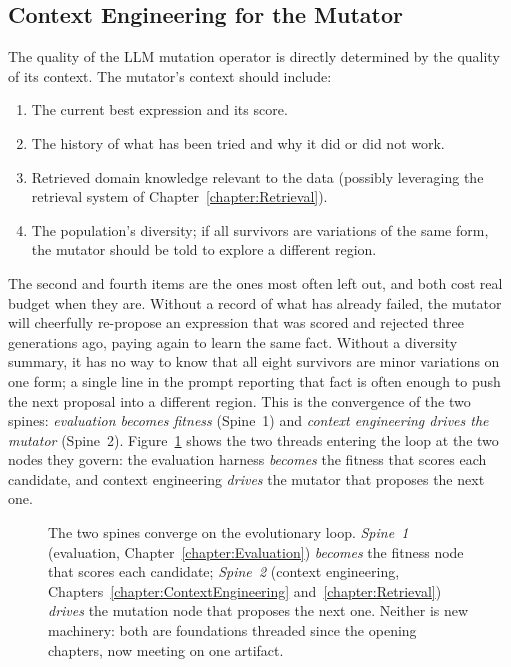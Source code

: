 \subsection{Context Engineering for the Mutator}

The quality of the LLM mutation operator is directly determined by the quality of its context.
The mutator's context should include:
\begin{enumerate}
\item The current best expression and its score.
\item The history of what has been tried and why it did or did not work.
\item Retrieved domain knowledge relevant to the data (possibly leveraging the retrieval system of Chapter~\ref{chapter:Retrieval}).
\item The population's diversity; if all survivors are variations of the same form, the mutator should be told to explore a different region.
\end{enumerate}
The second and fourth items are the ones most often left out, and both cost real budget when they are.
Without a record of what has already failed, the mutator will cheerfully re-propose an expression that was scored and rejected three generations ago, paying again to learn the same fact.
Without a diversity summary, it has no way to know that all eight survivors are minor variations on one form; a single line in the prompt reporting that fact is often enough to push the next proposal into a different region.
This is the convergence of the two spines: \emph{evaluation becomes fitness} (Spine~1) and \emph{context engineering drives the mutator} (Spine~2).
Figure~\ref{figure:TwoSpinesConverge} shows the two threads entering the loop at the two nodes they govern: the evaluation harness \emph{becomes} the fitness that scores each candidate, and context engineering \emph{drives} the mutator that proposes the next one.

\begin{figure}[htb!]
\begin{center}

\caption{The two spines converge on the evolutionary loop.
\emph{Spine~1} (evaluation, Chapter~\ref{chapter:Evaluation}) \emph{becomes} the fitness node that scores each candidate; \emph{Spine~2} (context engineering, Chapters~\ref{chapter:ContextEngineering} and~\ref{chapter:Retrieval}) \emph{drives} the mutation node that proposes the next one.
Neither is new machinery: both are foundations threaded since the opening chapters, now meeting on one artifact.}
\label{figure:TwoSpinesConverge}
\end{center}
\end{figure}

